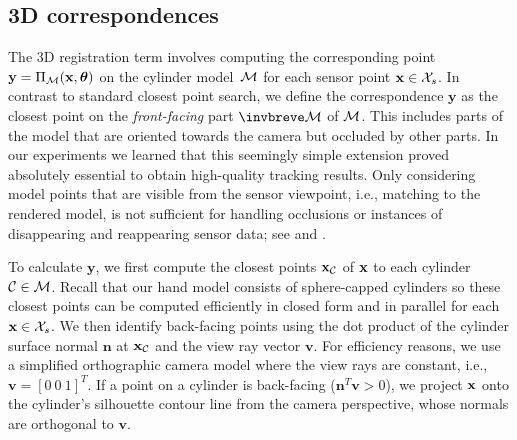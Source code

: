 



\subsection*{3D correspondences}
The 3D registration term involves computing the corresponding point  $\mathbf{y} = \Pi_{\mathcal{M}}(\mathbf{x},\boldsymbol{\theta})$ on the cylinder model~$\mathcal{M}$ for each sensor point $\mathbf{x} \in \mathcal{X}_{s}$. 
In contrast to standard closest point search, we define the correspondence $\mathbf{y}$  as the closest point on the \emph{front-facing} part $\visiblehand$ of $\mathcal{M}$. This includes parts of the model that are oriented towards the camera but occluded by other parts. 
 In our experiments we learned that this seemingly simple extension proved absolutely essential to obtain high-quality tracking results.
 Only considering model points that are visible from the sensor viewpoint, i.e., matching to the rendered model, is not sufficient for handling occlusions or instances of disappearing and reappearing sensor data; see  and . 
 
To calculate $\mathbf{y}$, we first compute the closest points $\mathbf{x}_\mathcal{C}$ of $\mathbf{x}$ to each cylinder $\mathcal{C}\in\mathcal{M}$. Recall that our hand model consists of sphere-capped cylinders so these closest points can be computed efficiently in closed form and in parallel for each $\mathbf{x} \in \mathcal{X}_{s}$.
We then identify back-facing points using the dot product of the cylinder surface normal $\mathbf{n}$ at $\mathbf{x}_\mathcal{C}$ and the view ray vector $\mathbf{v}$. 
%
For efficiency reasons, we use a simplified orthographic camera model where the view rays are constant, i.e., $\mathbf{v} = [0~0~1]^T$. If a point on a cylinder is back-facing ($\mathbf{n}^T\mathbf{v}>0$), we project $\mathbf{x}$ onto the cylinder's silhouette contour line from the camera perspective, whose normals are orthogonal to $\mathbf{v}$.

